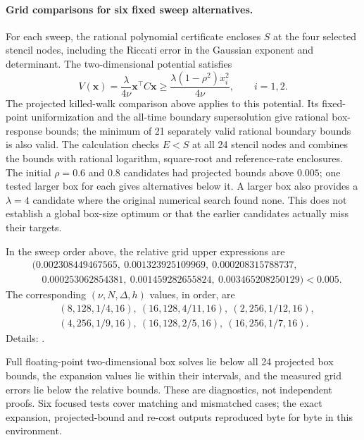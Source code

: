 \documentclass[11pt,a4paper]{article}
\newcommand{\x}{\mathbf x}
\begin{document}
\paragraph{Grid comparisons for six fixed sweep alternatives.}
For each sweep, the rational polynomial certificate encloses $S$ at the four
selected stencil nodes, including the Riccati error in the Gaussian exponent
and determinant. The two-dimensional potential satisfies
\[
 V(\x)=\frac{\lambda}{4\nu}\x^\top C\x\ge
 \frac{\lambda(1-\rho^2)x_i^2}{4\nu},\qquad i=1,2.
\]
The projected killed-walk comparison above applies to this potential.
Its fixed-point uniformization and
the all-time boundary supersolution give rational box-response bounds; the
minimum of 21 separately valid rational boundary bounds is also valid. The
calculation checks $E<S$ at all 24 stencil nodes and combines the bounds with
rational logarithm, square-root and reference-rate enclosures. The initial
$\rho=0.6$ and $0.8$ candidates had projected bounds above $0.005$; one
tested larger box for each gives alternatives below it. A larger box also
provides a $\lambda=4$ candidate where the original numerical search found
none. This does not establish a global box-size optimum or that the earlier
candidates actually miss their targets.

In the sweep order above, the relative grid upper expressions are
\[
\begin{aligned}
 &(0.002308449467565,\ 0.001323925109969,\ 0.000208315788737,\\
 &\quad 0.000253062854381,\ 0.001459282655824,\ 0.003465208250129)
 <0.005.
\end{aligned}
\]
The corresponding $(\nu,N,\Delta,h)$ values, in order, are
\[
\begin{aligned}
 &(8,128,1/4,16),\ (16,128,4/11,16),\ (2,256,1/12,16),\\
 &(4,256,1/9,16),\ (16,128,2/5,16),\ (16,256,1/7,16).
\end{aligned}
\]
Details: .

Full floating-point two-dimensional box solves lie below all 24 projected box
bounds, the expansion values lie within their intervals, and the measured
grid errors lie below the relative bounds. These are diagnostics, not
independent proofs. Six focused tests cover matching and mismatched cases;
the exact expansion, projected-bound and re-cost outputs reproduced byte for
byte in this environment.
\end{document}
